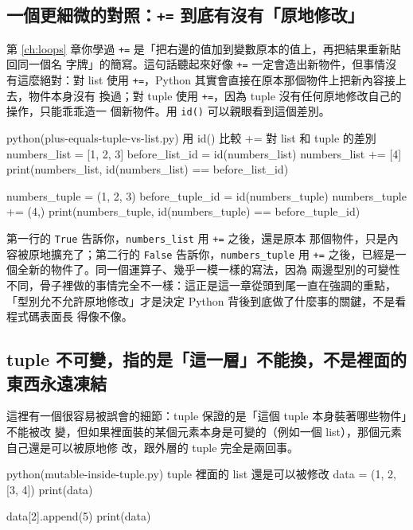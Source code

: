 \subsection*{一個更細微的對照：\texttt{+=} 到底有沒有「原地修改」}

第 \ref{ch:loops} 章你學過 \texttt{+=} 是「把右邊的值加到變數原本的值上，再把結果重新貼回同一個名
字牌」的簡寫。這句話聽起來好像 \texttt{+=} 一定會造出新物件，但事情沒有這麼絕對：對
list 使用 \texttt{+=}，Python 其實會直接在原本那個物件上把新內容接上去，物件本身沒有
換過；對 tuple 使用 \texttt{+=}，因為 tuple 沒有任何原地修改自己的操作，只能乖乖造一
個新物件。用 \texttt{id()} 可以親眼看到這個差別。

\begin{example}{python}{(plus-equals-tuple-vs-list.py) 用 id() 比較 += 對 list 和 tuple 的差別}
numbers_list = [1, 2, 3]
before_list_id = id(numbers_list)
numbers_list += [4]
print(numbers_list, id(numbers_list) == before_list_id)

numbers_tuple = (1, 2, 3)
before_tuple_id = id(numbers_tuple)
numbers_tuple += (4,)
print(numbers_tuple, id(numbers_tuple) == before_tuple_id)
\end{example}


第一行的 \texttt{True} 告訴你，\texttt{numbers\_list} 用 \texttt{+=} 之後，還是原本
那個物件，只是內容被原地擴充了；第二行的 \texttt{False} 告訴你，\texttt{numbers\_tuple}
用 \texttt{+=} 之後，已經是一個全新的物件了。同一個運算子、幾乎一模一樣的寫法，因為
兩邊型別的可變性不同，骨子裡做的事情完全不一樣：這正是這一章從頭到尾一直在強調的重點，
「型別允不允許原地修改」才是決定 Python 背後到底做了什麼事的關鍵，不是看程式碼表面長
得像不像。

\subsection*{tuple 不可變，指的是「這一層」不能換，不是裡面的東西永遠凍結}

這裡有一個很容易被誤會的細節：tuple 保證的是「這個 tuple 本身裝著哪些物件」不能被改
變，但如果裡面裝的某個元素本身是可變的（例如一個 list），那個元素自己還是可以被原地修
改，跟外層的 tuple 完全是兩回事。

\begin{example}{python}{(mutable-inside-tuple.py) tuple 裡面的 list 還是可以被修改}
data = (1, 2, [3, 4])
print(data)

data[2].append(5)
print(data)
\end{example}

